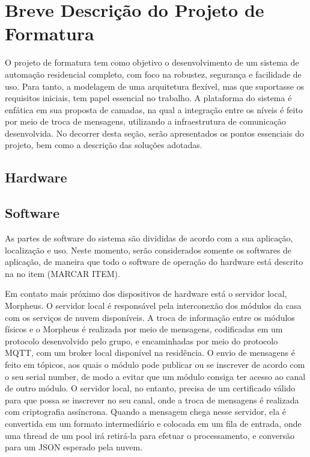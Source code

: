 \chapter{Breve Descrição do Projeto de Formatura}

O projeto de formatura tem como objetivo o desenvolvimento de um sistema de automação residencial completo, com foco na robustez, segurança e facilidade de uso. Para tanto, a modelagem de uma arquitetura flexível, mas que suportasse os requisitos iniciais, tem papel essencial no trabalho. A plataforma do sistema é enfática em sua proposta de camadas, na qual a integração entre os níveis é feito por meio de troca de mensagens, utilizando a infraestrutura de comunicação desenvolvida. No decorrer desta seção, serão apresentados os pontos essenciais do projeto, bem como a descrição das soluções adotadas.

\section{Hardware}


\section{Software}

As partes de software do sistema são divididas de acordo com a sua aplicação, localização e uso. Neste momento, serão considerados somente os softwares de aplicação, de maneira que todo o software de operação do hardware está descrito na no item (MARCAR ITEM).

Em contato mais próximo dos dispositivos de hardware está o servidor local, Morpheus. O servidor local é responsável pela interconexão dos módulos da casa com os serviços de nuvem disponíveis. A troca de informação entre os módulos físicos e o Morpheus é realizada por meio de mensagens, codificadas em um protocolo desenvolvido pelo grupo, e encaminhadas por meio do protocolo MQTT, com um broker local disponível na residência. O envio de mensagens é feito em tópicos, aos quais o módulo pode publicar ou se inscrever de acordo com o seu serial number, de modo a evitar que um módulo consiga ter acesso ao canal de outro módulo. O servidor local, no entanto, precisa de um certificado válido para que possa se inscrever no seu canal, onde a troca de mensagens é realizada com criptografia assíncrona. Quando a mensagem chega nesse servidor, ela é convertida em um formato intermediário e colocada em um fila de entrada, onde uma thread de um pool irá retirá-la para efetuar o processamento, e conversão para um JSON esperado pela nuvem.

